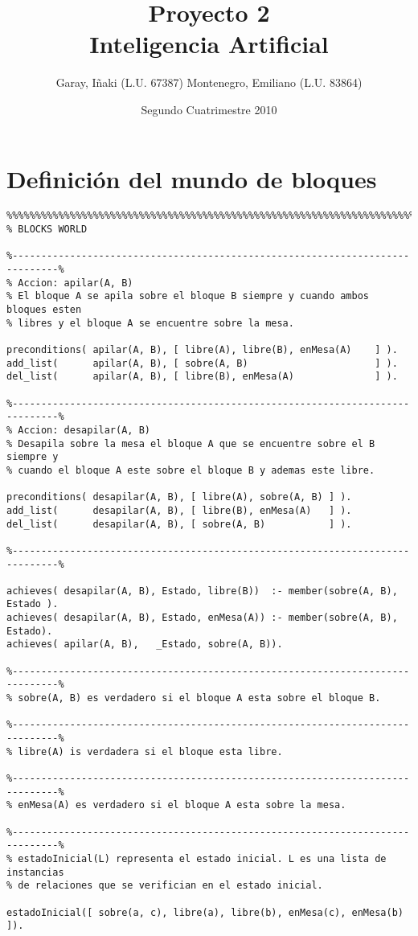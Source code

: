 \documentclass[a4paper,12pt]{report}
\title{Proyecto 2\\ Inteligencia Artificial}
\author{Garay, I\~{n}aki (L.U. 67387) Montenegro, Emiliano (L.U. 83864)}
\date{Segundo Cuatrimestre 2010}
\begin{document}
\maketitle
\tableofcontents

\chapter{Definici\'{o}n del mundo de bloques}

\begin{footnotesize}
\begin{verbatim}
%%%%%%%%%%%%%%%%%%%%%%%%%%%%%%%%%%%%%%%%%%%%%%%%%%%%%%%%%%%%%%%%%%%%%%%%%%%%%%%%
% BLOCKS WORLD

%------------------------------------------------------------------------------%
% Accion: apilar(A, B)
% El bloque A se apila sobre el bloque B siempre y cuando ambos bloques esten
% libres y el bloque A se encuentre sobre la mesa.

preconditions( apilar(A, B), [ libre(A), libre(B), enMesa(A)    ] ).
add_list(      apilar(A, B), [ sobre(A, B)                      ] ).
del_list(      apilar(A, B), [ libre(B), enMesa(A)              ] ).

%------------------------------------------------------------------------------%
% Accion: desapilar(A, B)
% Desapila sobre la mesa el bloque A que se encuentre sobre el B siempre y 
% cuando el bloque A este sobre el bloque B y ademas este libre. 

preconditions( desapilar(A, B), [ libre(A), sobre(A, B) ] ).
add_list(      desapilar(A, B), [ libre(B), enMesa(A)   ] ).
del_list(      desapilar(A, B), [ sobre(A, B)           ] ).

%------------------------------------------------------------------------------%

achieves( desapilar(A, B), Estado, libre(B))  :- member(sobre(A, B), Estado ).
achieves( desapilar(A, B), Estado, enMesa(A)) :- member(sobre(A, B), Estado).
achieves( apilar(A, B),   _Estado, sobre(A, B)).

%------------------------------------------------------------------------------%
% sobre(A, B) es verdadero si el bloque A esta sobre el bloque B.

%------------------------------------------------------------------------------%
% libre(A) is verdadera si el bloque esta libre.

%------------------------------------------------------------------------------%
% enMesa(A) es verdadero si el bloque A esta sobre la mesa.

%------------------------------------------------------------------------------%
% estadoInicial(L) representa el estado inicial. L es una lista de instancias
% de relaciones que se verifician en el estado inicial.

estadoInicial([ sobre(a, c), libre(a), libre(b), enMesa(c), enMesa(b) ]).

\end{verbatim}
\end{footnotesize}
\end{document}
